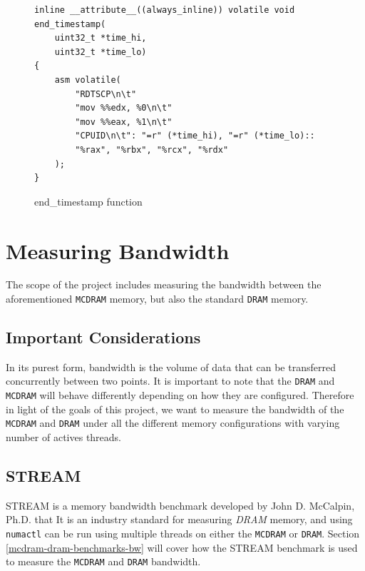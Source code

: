 \documentclass[bsc,frontabs,twoside,singlespacing,parskip,deptreport]{infthesis}     %
\begin{document}
\begin{figure}[h!]
    \centering
    \begin{verbatim}
inline __attribute__((always_inline)) volatile void end_timestamp(
    uint32_t *time_hi,
    uint32_t *time_lo)
{
    asm volatile(
        "RDTSCP\n\t"
        "mov %%edx, %0\n\t"
        "mov %%eax, %1\n\t"
        "CPUID\n\t": "=r" (*time_hi), "=r" (*time_lo)::
        "%rax", "%rbx", "%rcx", "%rdx"
    );
}
    \end{verbatim}
    \caption{end\_timestamp function}
    \label{fig:endtimestamp-code}
\end{figure}

\newpage
\section{Measuring Bandwidth}\label{measuring-bandwidth}
The scope of the project includes measuring the bandwidth between the aforementioned \texttt{MCDRAM} memory, but also the standard \texttt{DRAM} memory.

\subsection{Important Considerations}\label{bandwidth_considerations}
In its purest form, bandwidth is the volume of data that can be transferred concurrently between two points. It is important to note that the \texttt{DRAM} and \texttt{MCDRAM} will behave differently depending on how they are configured. Therefore in light of the goals of this project, we want to measure the bandwidth of the \texttt{MCDRAM} and \texttt{DRAM} under all the different memory configurations with varying number of actives threads.

\subsection{STREAM \cite{McCalpin1995}}
STREAM is a memory bandwidth benchmark developed by John D. McCalpin, Ph.D. that \cite{STREAM_FAQ} It is an industry standard for measuring \textit{DRAM} memory, and using \texttt{numactl}\cite{numactl_repo}\cite{numactl_man} can be run using multiple threads on either the \texttt{MCDRAM} or \texttt{DRAM}. Section \ref{mcdram-dram-benchmarks-bw} will cover how the STREAM benchmark is used to measure the \texttt{MCDRAM} and \texttt{DRAM} bandwidth.
\end{document}
